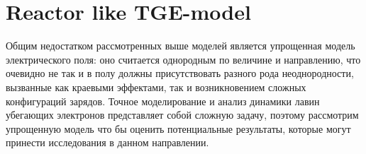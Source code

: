 \section{Reactor like TGE-model}\label{sec:thunderstorm/reactor}


Общим недостатком рассмотренных выше моделей является упрощенная модель электрического поля: оно считается однородным по величине и направлению, что очевидно не так и в полу должны присутствовать разного рода неоднородности, вызванные как краевыми эффектами, так и возникновением сложных конфигураций зарядов. Точное моделирование и анализ динамики лавин убегающих электронов представляет собой сложную задачу, поэтому рассмотрим упрощенную модель что бы оценить потенциальные результаты, которые могут принести исследования в данном направлении. 

